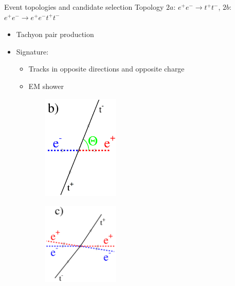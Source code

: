 \documentclass{beamer}
\begin{document}
\begin{frame}{Event topologies and candidate selection}
  Topology $2a$: $e^+e^-\to t^+t^-$, $2b$: $e^+e^-\to e^+e^-t^+t^-$
  \begin{itemize}
    \item{Tachyon pair production}
    \item{Signature:}
    \begin{itemize}
      \item{Tracks in opposite directions and opposite charge}
      \item{EM shower}
    \end{itemize}
  \end{itemize}
  \begin{figure}
    \centering
    \begin{subfigure}{0.5\textwidth}
      \centering
      \includegraphics[width = 0.4\textwidth]{TopologyB.png}
    \end{subfigure}%
    \begin{subfigure}{0.5\textwidth}
      \centering
      \includegraphics[width = 0.4\textwidth]{TopologyC.png}
    \end{subfigure}
  \end{figure}
\end{frame}
\end{document}
